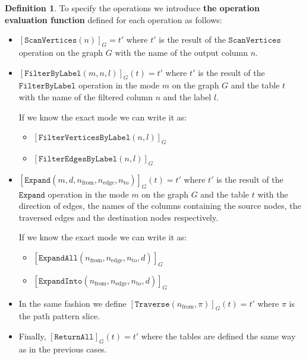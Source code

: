 \documentclass[14pt]{constructor-thesis}
\theoremstyle{definition}
\newtheorem{definition}{Definition}
\begin{document}
\begin{definition}
  To specify the operations we introduce \textbf{the operation evaluation function} defined for each operation as follows:
  \begin{itemize}
    \item $ [\texttt{ScanVertices}(n)]_G = t'$ where $t'$ is the result of the $\texttt{ScanVertices}$ operation on the graph $G$ with the name of the output column $n$.
    \item $ [\texttt{FilterByLabel}(m, n, l)]_G (t) = t' $ where $t'$ is the result of the \\ $\texttt{FilterByLabel}$ operation in the mode $m$ on the graph $G$ and the table $t$ with the name of the filtered column $n$ and the label $l$. 
    
    If we know the exact mode we can write it as:
    \begin{itemize}
      \item $[\texttt{FilterVerticesByLabel}(n, l)]_G$
      \item $[\texttt{FilterEdgesByLabel}(n, l)]_G$
    \end{itemize}

    \item $ [\texttt{Expand}(m, d, n_{\mathrm{from}}, n_{\mathrm{edge}}, n_{\mathrm{to}})]_G (t) = t' $ where $t'$ is the result of the $\texttt{Expand}$ operation in the mode $m$ on the graph $G$ and the table $t$ with the direction of edges, the names of the columns containing the source nodes, the traversed edges and the destination nodes respectively.
    
    If we know the exact mode we can write it as:
    \begin{itemize}
      \item $[\texttt{ExpandAll}(n_{\mathrm{from}}, n_{\mathrm{edge}}, n_{\mathrm{to}}, d)]_G$
      \item $[\texttt{ExpandInto}(n_{\mathrm{from}}, n_{\mathrm{edge}}, n_{\mathrm{to}}, d)]_G$
    \end{itemize}

    \item In the same fashion we define $[\texttt{Traverse}(n_{\mathrm{from}}, \pi)]_G(t) = t'$ where $\pi$ is the path pattern slice.
    
    \item Finally, $[\texttt{ReturnAll}]_G(t) = t'$ where the tables are defined the same way as in the previous cases.
  \end{itemize}
\end{definition}
\end{document}
